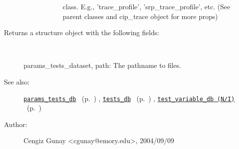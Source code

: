 \begin{description}
\begin{description}
\begin{description}
class. E.g., 'trace\_profile', 'srp\_trace\_profile', etc.
(See parent classes and cip\_trace object for more props)\end{description}%
\end{description}%
%
\item[Returns a structure object with the following fields:]~

	params\_tests\_dataset,
	path: The pathname to files.
%
%
\item[See also:]%
\hyperlink{ref_params_tests_db}{\texttt{params\_tests\_db}}%
\ (p.~\pageref{ref_params_tests_db})%
%
, \hyperlink{ref_tests_db}{\texttt{tests\_db}}%
\ (p.~\pageref{ref_tests_db})%
%
, \hyperlink{ref_test_variable_db (N__I)}{\texttt{test\_variable\_db (N/I)}}%
\ (p.~\pageref{ref_test_variable_db (N__I)})%
%
%
\item[Author:]%
Cengiz Gunay <cgunay@emory.edu>, 2004/09/09%
\end{description}
\methodline%
